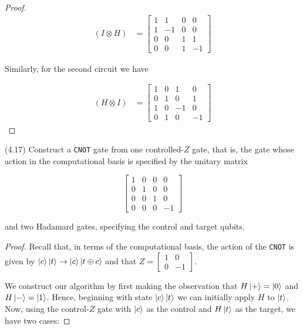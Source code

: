 \documentclass[main.tex]{subfiles}
\begin{document}
\begin{subappendices}
\begin{exercise}
\begin{proof}
\begin{align*}
	(I \otimes H) &= \begin{bmatrix}	
	1 & 1 & 0 & 0 \\
	1 & -1 & 0 & 0 \\
	0 & 0 & 1 & 1 \\
	0 & 0 & 1 & -1
 \end{bmatrix}
\end{align*}

Similarly, for the second circuit we have

\begin{align*}
	(H \otimes I) &= \begin{bmatrix}	
	1 & 0 & 1 & 0 \\
	0 & 1 & 0 & 1 \\
	1 & 0 & -1 & 0 \\
	0 & 1 & 0 & -1
 \end{bmatrix}
\end{align*}
\end{proof}	
\end{exercise}

\begin{exercise} (4.17)
Construct a \texttt{CNOT} gate from one controlled-$Z$ gate, that is, the gate whose action in the computational basis is specified by the unitary matrix

$$
\begin{bmatrix}
1 & 0 & 0 & 0 \\
0 & 1 & 0 & 0 \\
0 & 0 & 1 & 0 \\
0 & 0 & 0 & -1		
\end{bmatrix}
$$

and two Hadamard gates, specifying the control and target qubits.

\begin{proof}
Recall that, in terms of the computational basis, the action of the \texttt{CNOT} is given by $\ket{c}\ket{t} \rightarrow \ket{c} \ket{t \oplus c}$ and that $Z = \begin{bmatrix} 1 & 0 \\ 0 & -1 \end{bmatrix}$.

We construct our algorithm by first making the observation that $H\ket{+} = \ket{0}$ and $H\ket{-} = \ket{1}$. Hence, beginning with state $\ket{c}\ket{t}$ we can initially apply $H$ to $\ket{t}$. Now, using the control-$Z$ gate with $\ket{c}$ as the control and $H\ket{t}$ as the target, we have two cases: 


\end{proof}
\end{exercise}
\end{subappendices}
\end{document}
